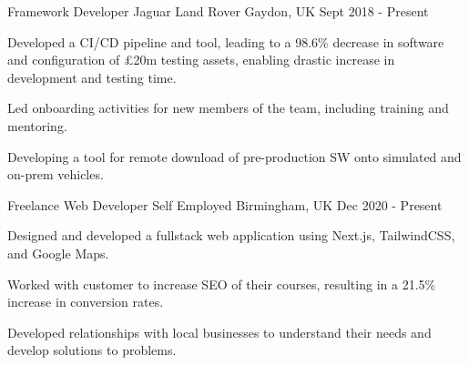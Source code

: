 

\begin{cventries}

  \cventry
    {Framework Developer} %
    {Jaguar Land Rover} %
    {Gaydon, UK} %
    {Sept 2018 - Present} %
    {
      \begin{cvitems} %
        \item Developed a CI/CD pipeline and tool, leading to a 98.6\% decrease in software and configuration of £20m testing assets, enabling drastic increase in development and testing time.
        \item Led onboarding activities for new members of the team, including training and mentoring.
        \item Developing a tool for remote download of pre-production SW onto simulated and on-prem vehicles.
  \end{cvitems}
    }

  \cventry
    {Freelance Web Developer} %
    {Self Employed} %
    {Birmingham, UK} %
    {Dec 2020 - Present} %
    {
      \begin{cvitems} %
        \item Designed and developed a fullstack web application using Next.js, TailwindCSS, and Google Maps.
        \item Worked with customer to increase SEO of their courses, resulting in a 21.5\% increase in conversion rates.
        \item Developed relationships with local businesses to understand their needs and develop solutions to problems.
      \end{cvitems}
    }

\end{cventries}
